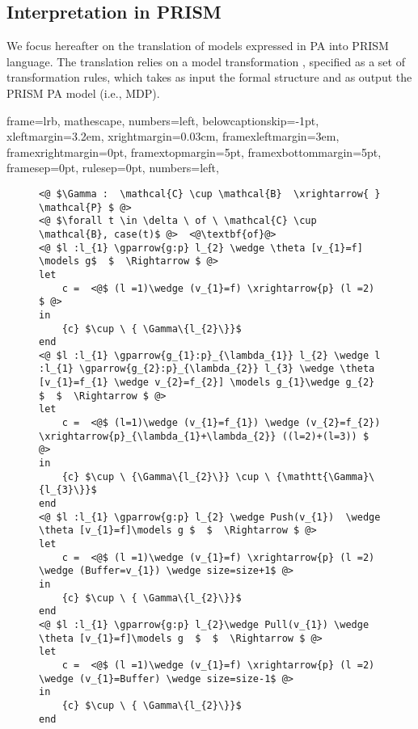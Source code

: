\subsection{Interpretation in PRISM}
\label{PRISM}

We focus hereafter on the translation of \cpc models expressed in PA into PRISM language. The translation relies on a model transformation \quot{\emath{\mathtt{\Gamma}}}, specified as a set of transformation rules, which takes as input the \cpc formal structure and as output the PRISM PA model (i.e., MDP).


{
	frame=lrb,         
	mathescape,
	numbers=left,
	belowcaptionskip=-1pt,
    xleftmargin=3.2em,
	xrightmargin=0.03cm,
    framexleftmargin=3em,
	framexrightmargin=0pt,
	framextopmargin=5pt,
	framexbottommargin=5pt,
	framesep=0pt,
	rulesep=0pt,
	numbers=left,
}

            
         
\noindent    
\begin{figure}[!htb]   
\begin{minipage}{9cm}
\begin{lstlisting}[style=framed,%customc,
	caption=Generating PRISM Code,
	label=prismgeneration]
<@ $\Gamma :  \mathcal{C} \cup \mathcal{B}  \xrightarrow{ } \mathcal{P} $ @> 
<@ $\forall t \in \delta \ of \ \mathcal{C} \cup \mathcal{B}, case(t)$ @>  <@\textbf{of}@> 	
<@ $l :l_{1} \gparrow{g:p} l_{2} \wedge \theta [v_{1}=f] \models g$  $  \Rightarrow $ @> 
let
    c =  <@$ (l =1)\wedge (v_{1}=f) \xrightarrow{p} (l =2) $ @>
in
    {c} $\cup \ { \Gamma\{l_{2}\}}$
end
<@ $l :l_{1} \gparrow{g_{1}:p}_{\lambda_{1}} l_{2} \wedge l :l_{1} \gparrow{g_{2}:p}_{\lambda_{2}} l_{3} \wedge \theta [v_{1}=f_{1} \wedge v_{2}=f_{2}] \models g_{1}\wedge g_{2} $  $  \Rightarrow $ @> 
let
    c =  <@$ (l=1)\wedge (v_{1}=f_{1}) \wedge (v_{2}=f_{2}) \xrightarrow{p}_{\lambda_{1}+\lambda_{2}} ((l=2)+(l=3)) $ @>
in
    {c} $\cup \ {\Gamma\{l_{2}\}} \cup \ {\mathtt{\Gamma}\{l_{3}\}}$
end
<@ $l :l_{1} \gparrow{g:p} l_{2} \wedge Push(v_{1})  \wedge \theta [v_{1}=f]\models g $  $  \Rightarrow $ @> 
let
    c =  <@$ (l =1)\wedge (v_{1}=f) \xrightarrow{p} (l =2) \wedge (Buffer=v_{1}) \wedge size=size+1$ @>
in
    {c} $\cup \ { \Gamma\{l_{2}\}}$
end
<@ $l :l_{1} \gparrow{g:p} l_{2}\wedge Pull(v_{1}) \wedge \theta [v_{1}=f]\models g  $  $  \Rightarrow $ @> 
let
    c =  <@$ (l =1)\wedge (v_{1}=f) \xrightarrow{p} (l =2) \wedge (v_{1}=Buffer) \wedge size=size-1$ @>
in
    {c} $\cup \ { \Gamma\{l_{2}\}}$
end
\end{lstlisting}
 \end{minipage} 
 \end{figure}   
 
